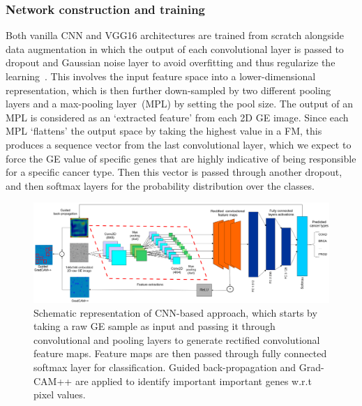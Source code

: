 \subsubsection{Network construction and training}
Both vanilla CNN and VGG16 architectures are trained from scratch alongside data augmentation in which the output of each convolutional layer is passed to dropout and Gaussian noise layer to avoid overfitting and thus regularize the learning~\cite{vardropout}. This involves the input feature space into a lower-dimensional representation, which is then further down-sampled by two different pooling layers and a max-pooling layer~(MPL) by setting the pool size. The output of an MPL is considered as an `extracted feature' from each 2D GE image. Since each MPL `flattens' the output space by taking the highest value in a FM, this produces a sequence vector from the last convolutional layer, which we expect to force the GE value of specific genes that are highly indicative of being responsible for a specific cancer type. Then this vector is passed through another dropout, and then softmax layers for the probability distribution over the classes.

\begin{figure}[h]
	\centering
	\includegraphics[scale=0.55]{images/clstm.PNG}
    \caption{Schematic representation of CNN-based approach, which starts by taking a raw GE sample as input and passing it through convolutional and pooling layers to generate rectified convolutional feature maps. Feature maps are then passed through fully connected softmax layer for classification. Guided back-propagation and Grad-CAM++ are applied to identify important important genes w.r.t pixel values.}	
	\label{fig:clstm}
\end{figure}

